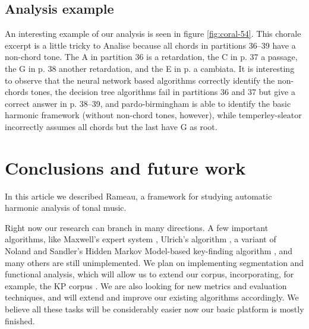 \documentclass{article}
\begin{document}
\subsection{Analysis example}
\label{sec:analysis-example}

An interesting example of our analysis is seen in figure
\ref{fig:coral-54}. This chorale excerpt is a little tricky to Analise
because all chords in partitions 36--39 have a non-chord tone. The A
in partition 36 is a retardation, the C in p. 37 a passage, the G in
p. 38 another retardation, and the E in p. a cambiata. It is
interesting to observe that the neural network based algorithms
correctly identify the non-chords tones, the decision tree algorithms
fail in partitions 36 and 37 but give a correct answer in p. 38--39,
and pardo-birmingham is able to identify the basic harmonic framework
(without non-chord tones, however), while temperley-sleator
incorrectly assumes all chords but the last have G as root.

\section{Conclusions and future work}
\label{sec:concl-future-work}

In this article we described Rameau, a framework for studying
automatic harmonic analysis of tonal music.

Right now our research can branch in many directions. A few important
algorithms, like Maxwell's expert system \cite{maxwell:expert},
Ulrich's algorithm \cite{ulrich:analysis}, a variant of Noland and
Sandler's Hidden Markov Model-based key-finding algorithm
\cite{noland.ea:key}, and many others are still unimplemented. We plan
on implementing segmentation and functional analysis, which will allow
us to extend our corpus, incorporating, for example, the KP corpus
\cite{temperley:bayesian}. We are also looking for new metrics and
evaluation techniques, and will extend and improve our existing
algorithms accordingly. We believe all these tasks will be
considerably easier now our basic platform is mostly finished.




\end{document}
